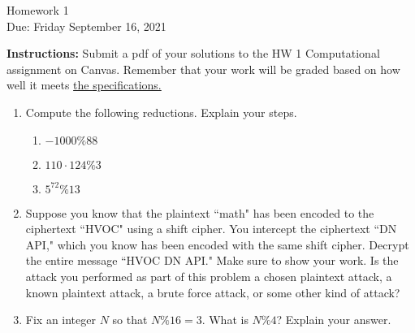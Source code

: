 \documentclass[10pt,a4paper]{article}
\begin{document}
\begin{center}
{\Large Homework 1}\\
Due: Friday September 16, 2021\\


\end{center}
{\bf Instructions:} Submit a pdf of your solutions to the HW 1 Computational assignment on Canvas. Remember that your work will be graded based on how well it meets \href{https://docs.google.com/document/d/1emM06_WRh_h941rsjtRE9fRVndJtfRKd9gyS3Fs_rFA/edit?usp=sharing}{the specifications. }

\begin{enumerate}
\item Compute the following reductions.  Explain your steps. 
\begin{enumerate}
\item $-1000 \% 88$
\item $110\cdot 124 \% 3$
\item $5^{72} \% 13$
\end{enumerate}
\item Suppose you know that the plaintext ``math" has been encoded to the ciphertext ``HVOC" using a shift cipher.  You intercept the ciphertext ``DN API," which you know has been encoded with the same shift cipher.  Decrypt the entire message ``HVOC DN API." Make sure to show your work.   Is the attack you performed as part of this problem a chosen plaintext attack, a known plaintext attack, a brute force attack, or some other kind of attack?
\item Fix an integer $N$ so that $N\%16 = 3$.  What is $N\%4$?  Explain your answer.
\end{enumerate}
\end{document}
